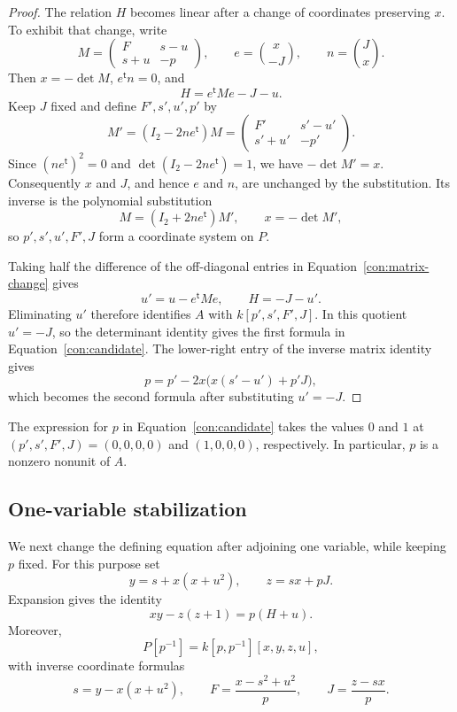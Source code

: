 \begin{proof}
The relation $H$ becomes linear after a change of coordinates preserving $x$.
To exhibit that change, write
\[
 M=\begin{pmatrix}F&s-u\\s+u&-p\end{pmatrix},\qquad
 e=\binom{x}{-J},\qquad n=\binom{J}{x}.
\]
Then $x=-\det M$, $e^{\mathsf t}n=0$, and
\[
 H=e^{\mathsf t}Me-J-u.
\]
Keep $J$ fixed and define $F',s',u',p'$ by
\begin{equation}\label{con:matrix-change}
 M'=(I_2-2ne^{\mathsf t})M
   =\begin{pmatrix}F'&s'-u'\\s'+u'&-p'\end{pmatrix}.
\end{equation}
Since $(ne^{\mathsf t})^2=0$ and $\det(I_2-2ne^{\mathsf t})=1$,
we have $-\det M'=x$.  Consequently $x$ and $J$, and hence $e$ and $n$,
are unchanged by the substitution.  Its inverse is the polynomial substitution
\[
 M=(I_2+2ne^{\mathsf t})M',\qquad x=-\det M',
\]
so $p',s',u',F',J$ form a coordinate system on $P$.

Taking half the difference of the off-diagonal entries in
Equation~\eqref{con:matrix-change} gives
\[
 u'=u-e^{\mathsf t}Me,\qquad H=-J-u'.
\]
Eliminating $u'$ therefore identifies $A$ with $k[p',s',F',J]$.
In this quotient $u'=-J$, so the determinant identity gives the first formula
in Equation~\eqref{con:candidate}.  The lower-right entry of the inverse
matrix identity gives
\[
 p=p'-2x\bigl(x(s'-u')+p'J\bigr),
\]
which becomes the second formula after substituting $u'=-J$.
\end{proof}

The expression for $p$ in Equation~\eqref{con:candidate} takes the values $0$ and $1$ at
$(p',s',F',J)=(0,0,0,0)$ and $(1,0,0,0)$, respectively.  In particular,
$p$ is a nonzero nonunit of $A$.

\subsection{One-variable stabilization}

We next change the defining equation after adjoining one variable, while
keeping $p$ fixed.  For this purpose set
\begin{equation}\label{con:xyz}
 y=s+x(x+u^2),\qquad z=sx+pJ.
\end{equation}
Expansion gives the identity
\begin{equation}\label{con:quadric-identity}
 xy-z(z+1)=p(H+u).
\end{equation}
Moreover,
\begin{equation}\label{con:localized-coordinates}
 P[p^{-1}]=k[p,p^{-1}][x,y,z,u],
\end{equation}
with inverse coordinate formulas
\begin{equation}\label{con:localized-inverse}
 s=y-x(x+u^2),\qquad
 F=\frac{x-s^2+u^2}{p},\qquad
 J=\frac{z-sx}{p}.
\end{equation}

